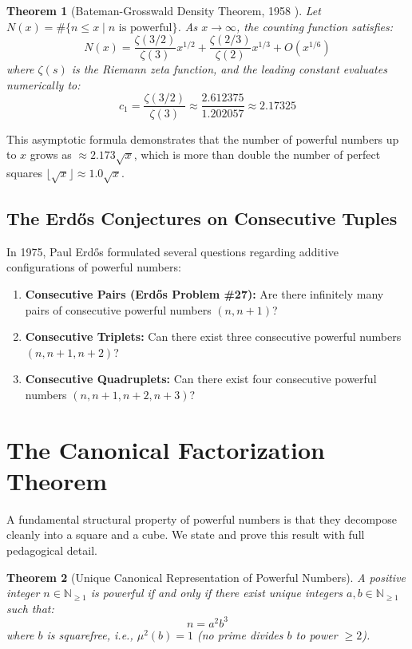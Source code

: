 \documentclass[11pt,a4paper]{article}
\newtheorem{theorem}{Theorem}[section]
\theoremstyle{definition}
\begin{document}
\begin{theorem}[Bateman-Grosswald Density Theorem, 1958 \cite{bateman1958}]\label{thm:density}
Let $N(x) = \#\{n \le x \mid n \text{ is powerful}\}$. As $x \to \infty$, the counting function satisfies:
\begin{equation}\label{eq:density}
N(x) = \frac{\zeta(3/2)}{\zeta(3)} x^{1/2} + \frac{\zeta(2/3)}{\zeta(2)} x^{1/3} + O\left(x^{1/6}\right)
\end{equation}
where $\zeta(s)$ is the Riemann zeta function, and the leading constant evaluates numerically to:
\[ c_1 = \frac{\zeta(3/2)}{\zeta(3)} \approx \frac{2.612375}{1.202057} \approx 2.17325 \]
\end{theorem}

This asymptotic formula demonstrates that the number of powerful numbers up to $x$ grows as $\approx 2.173 \sqrt{x}$, which is more than double the number of perfect squares $\lfloor \sqrt{x} \rfloor \approx 1.0 \sqrt{x}$.

\subsection{The Erd\H{o}s Conjectures on Consecutive Tuples}
In 1975, Paul Erd\H{o}s \cite{erdos1976} formulated several questions regarding additive configurations of powerful numbers:

\begin{enumerate}
    \item \textbf{Consecutive Pairs (Erd\H{o}s Problem \#27):} Are there infinitely many pairs of consecutive powerful numbers $(n, n+1)$?
    \item \textbf{Consecutive Triplets:} Can there exist three consecutive powerful numbers $(n, n+1, n+2)$?
    \item \textbf{Consecutive Quadruplets:} Can there exist four consecutive powerful numbers $(n, n+1, n+2, n+3)$?
\end{enumerate}

\section{The Canonical Factorization Theorem}

A fundamental structural property of powerful numbers is that they decompose cleanly into a square and a cube. We state and prove this result with full pedagogical detail.

\begin{theorem}[Unique Canonical Representation of Powerful Numbers]\label{thm:canonical}
A positive integer $n \in \mathbb{N}_{\ge 1}$ is powerful if and only if there exist unique integers $a, b \in \mathbb{N}_{\ge 1}$ such that:
\begin{equation}\label{eq:canon_rep}
n = a^2 b^3
\end{equation}
where $b$ is squarefree, i.e., $\mu^2(b) = 1$ (no prime divides $b$ to power $\ge 2$).
\end{theorem}
\end{document}
